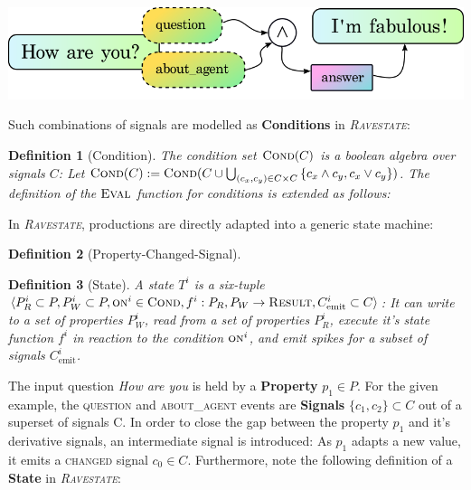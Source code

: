 \documentclass{article}
\newcommand{\rasta}{\textit{\textsc{Ravestate}}\xspace}
\newcommand{\mathsc}[1]{\text{\textsc{#1}}}
\newenvironment{Figure}
  {\par\medskip\noindent\minipage{\linewidth}}
  {\endminipage\par\medskip}
\newtheorem{definition}{Definition}
\begin{document}
\begin{multicols}{2}
\begin{Figure}
\centering
\includegraphics[scale=0.7]{figs/ex1.png}
\label{fig:ex1}
\end{Figure}

Such combinations of signals are modelled as \textbf{Conditions} in \rasta:

\begin{definition}[Condition]
The condition set $\mathsc{Cond}(C)$ is a boolean algebra over signals $C$: Let $\mathsc{Cond}(C) := \mathsc{Cond}(C \cup \bigcup_{(c_x, c_y) \in C \times C}{\{c_x \land c_y, c_x \lor c_y\}})$. The definition of the $\mathsc{Eval}$ function for conditions is extended as follows: 
\end{definition}

In \rasta, productions are directly adapted into a generic state machine: 

\begin{definition}[Property-Changed-Signal]
\end{definition}

\begin{definition}[State]
A state $T^i$ is a six-tuple $\langle P^i_R \subset P, P^i_W \subset P, \mathsc{on}^i \in \mathsc{Cond}, f^i : P_R, P_W \rightarrow \mathsc{Result}, C^i_\text{emit} \subset C \rangle$: It can write to a set of properties $P^i_W$, read from a set of properties $P^i_R$, execute it's state function $f^i$ in reaction to the condition $\text{\textsc{on}}^i$, and emit spikes for a subset of signals $C^i_\text{emit}$. 
\end{definition}

The input question \textit{How are you} is held by a \textbf{Property} $p_1 \in P$. For the given example, the \textsc{question} and \textsc{about\_agent} events are \textbf{Signals} $\{c_1, c_2\} \subset C$ out of a superset of signals C. In order to close the gap between the property $p_1$ and it's derivative signals, an intermediate signal is introduced: As $p_1$ adapts a new value, it emits a \textsc{changed} signal $c_0 \in C$. Furthermore, note the following definition of a \textbf{State} in \rasta:


\end{multicols}
\end{document}

